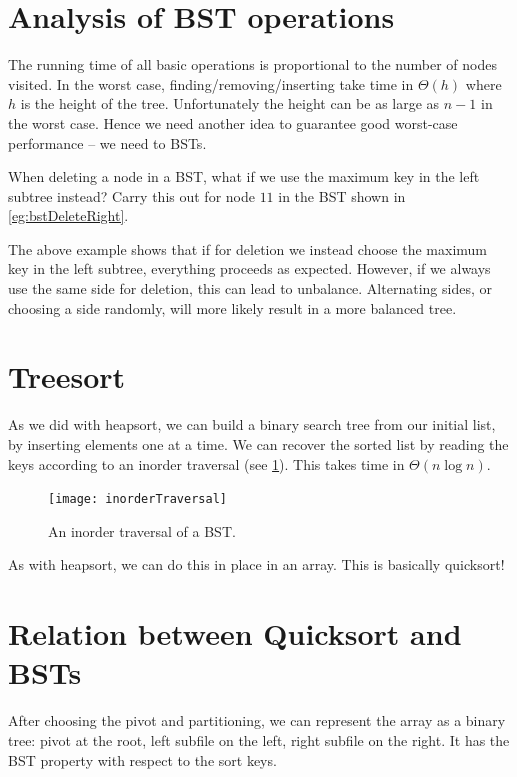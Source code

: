 \section{Analysis of BST operations}
The running time of all basic operations is proportional to the number of 
nodes visited. In the worst case, finding/removing/inserting take time in $\Theta(h)$ 
where $h$ is the height of the tree. 
Unfortunately the height can be as large as $n-1$ in the worst case. 
Hence we need another idea to guarantee good worst-case performance -- we need to  BSTs.

\begin{Boxample}[5] \label{eg:bstDeleteLeft}
When deleting a node  in a BST, what if we use the maximum key in the left subtree instead?
Carry this out for node $11$ in the BST shown in \cref{eg:bstDeleteRight}.
\end{Boxample}

The above example shows that if for deletion we instead choose the maximum key in the left subtree, everything proceeds as expected. 
However, if we always use the same side for deletion, this can lead to unbalance. 
Alternating sides, or choosing a side randomly, will more likely result in a more balanced tree.


\section{Treesort}
As we did with heapsort, we can build a binary search tree from our initial list, by inserting elements one at a time. 
We can recover the sorted list by reading the keys according to an inorder traversal (see \cref{fig:inorderTraversal}). 
This takes time in $\Theta(n \log n)$.

\begin{figure}[htb]
  \centering
  \texttt{[image: inorderTraversal]}
  \caption{An inorder traversal of a BST.}
  \label{fig:inorderTraversal}
\end{figure}

As with heapsort, we can do this in place in an array. This is basically quicksort!

\section{Relation between Quicksort and BSTs}
After choosing the pivot and partitioning, we can represent the array as a 
binary tree: pivot at the root, left subfile on the left, right subfile on the 
right. It has the BST property with respect to the sort keys.

